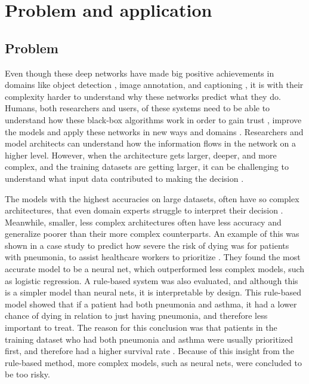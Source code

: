 \label{sec:2_problem_and_application}
\section{Problem and application}
\subsection{Problem}

Even though these deep networks have made big positive achievements in domains like object detection \cite{girshickRichFeatureHierarchies2014, renFasterRCNNRealTime2015, redmonYouOnlyLook2016, linFocalLossDense2017}, image annotation, and captioning \cite{vinyalsShowTellNeural2015, karpathyDeepVisualSemanticAlignments2015, johnsonDenseCapFullyConvolutional2016, tranRichImageCaptioning2016}, it is with their complexity harder to understand why these networks predict what they do. Humans, both researchers and users, of these systems need to be able to understand how these black-box algorithms work in order to gain trust \cite{koehlerExplanationImaginationConfidence1991, herlockerExplainingCollaborativeFiltering2000, dzindoletRoleTrustAutomation2003}, improve the models and apply these networks in new ways and domains \cite{jiangArtificialIntelligenceHealthcare2017, tonekaboniWhatCliniciansWant2019, holzingerCausabilityExplainabilityArtificial2019, guptaDeepLearningObject2021, tjoaSurveyExplainableArtificial2021}. Researchers and model architects can understand how the information flows in the network on a higher level. However, when the architecture gets larger, deeper, and more complex, and the training datasets are getting larger, it can be challenging to understand what input data contributed to making the decision \cite{sagirogluBigDataReview2013}.

The models with the highest accuracies on large datasets, often have so complex architectures, that even domain experts struggle to interpret their decision \cite{caruanaIntelligibleModelsHealthCare2015}. Meanwhile, smaller, less complex architectures often have less accuracy and generalize poorer than their more complex counterparts. An example of this was shown in a case study to predict how severe the risk of dying was for patients with pneumonia, to assist healthcare workers to prioritize \cite{cooperPredictingDireOutcomes2005}. They found the most accurate model to be a neural net, which outperformed less complex models, such as logistic regression. A rule-based system was also evaluated, and although this is a simpler model than neural nets, it is interpretable by design. This rule-based model showed that if a patient had both pneumonia and asthma, it had a lower chance of dying in relation to just having pneumonia, and therefore less important to treat. The reason for this conclusion was that patients in the training dataset who had both pneumonia and asthma were usually prioritized first, and therefore had a higher survival rate \cite{cooperEvaluationMachinelearningMethods1997}. Because of this insight from the rule-based method, more complex models, such as neural nets, were concluded to be too risky.

